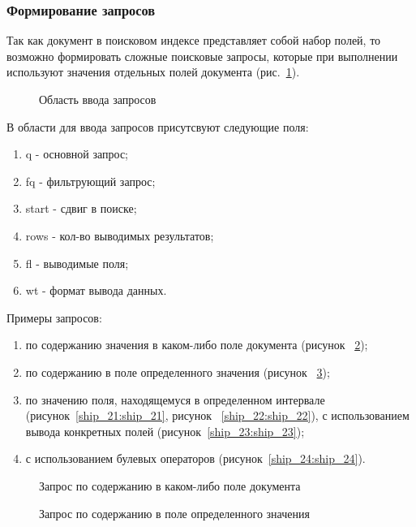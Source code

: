 \subsubsection{Формирование запросов}
Так как документ в поисковом индексе представляет собой набор полей, то возможно формировать сложные поисковые запросы, которые при выполнении используют значения отдельных полей документа (рис.~\ref{ship_18:ship_18}). 

\begin{figure}[h!]
\caption{Область ввода запросов}
\label{ship_18:ship_18}
\end{figure}

В области для ввода запросов присутсвуют следующие поля:
\begin{enumerate}
  \item q - основной запрос;
  \item fq - фильтрующий запрос;
  \item start - сдвиг в поиске;
  \item rows - кол-во выводимых результатов;
  \item fl - выводимые поля;
  \item wt - формат вывода данных.
\end{enumerate}

Примеры запросов:
\begin{enumerate}
  \item по содержанию значения в каком-либо поле документа (рисунок ~\ref{ship_19:ship_19});
  \item по содержанию в поле определенного значения (рисунок ~\ref{ship_20:ship_20});
  \item по значению поля, находящемуся в определенном интервале (рисунок~\ref{ship_21:ship_21}, рисунок ~\ref{ship_22:ship_22}), с использованием вывода конкретных полей (рисунок~\ref{ship_23:ship_23});
  \item с использованием булевых операторов (рисунок~\ref{ship_24:ship_24}).
\end{enumerate}

\begin{figure}[h!]
\caption{Запрос по содержанию в каком-либо поле документа}
\label{ship_19:ship_19}
\end{figure}

\begin{figure}[h!]
\caption{Запрос по содержанию в поле определенного значения}
\label{ship_20:ship_20}
\end{figure}

